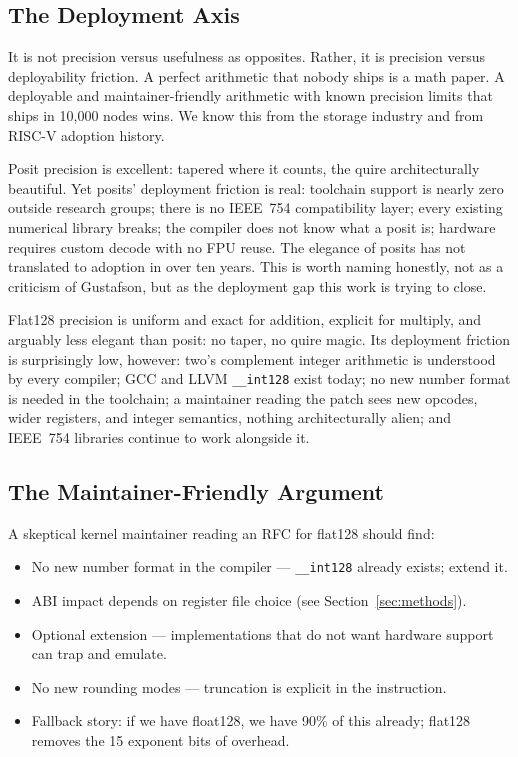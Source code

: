 \documentclass[runningheads]{llncs}
\begin{document}
\subsection{The Deployment Axis}

It is not precision versus usefulness as opposites. Rather, it is
precision versus deployability friction. A perfect arithmetic that nobody
ships is a math paper. A deployable and maintainer-friendly arithmetic
with known precision limits that ships in 10,000 nodes wins. We know
this from the storage industry and from RISC-V adoption history.

Posit precision is excellent: tapered where it counts, the quire architecturally beautiful. Yet posits' deployment friction is real: toolchain support is nearly zero outside research groups; there is no IEEE~754 compatibility layer; every existing numerical library breaks; the compiler does not know what a posit is; hardware requires custom decode with no FPU reuse. The elegance of posits has not translated to adoption in over ten years. This is worth naming honestly, not as a criticism of Gustafson, but as the deployment gap this work is trying to close.

Flat128 precision is uniform and exact for addition, explicit for multiply, and arguably less elegant than posit: no taper, no quire magic. Its deployment friction is surprisingly low, however: two's complement integer arithmetic is understood by every compiler; GCC and LLVM \texttt{\_\_int128} exist today; no new number format is needed in the toolchain; a maintainer reading the patch sees new opcodes, wider registers, and integer semantics, nothing architecturally alien; and IEEE~754 libraries continue to work alongside it.

\subsection{The Maintainer-Friendly Argument}

A skeptical kernel maintainer reading an RFC for flat128 should find:
\begin{itemize}
  \setlength{\itemsep}{4pt}
  \item No new number format in the compiler --- \texttt{\_\_int128}
  already exists; extend it.
  \item ABI impact depends on register file choice (see
  Section~\ref{sec:methods}).
  \item Optional extension --- implementations that do not want hardware
  support can trap and emulate.
  \item No new rounding modes --- truncation is explicit in the
  instruction.
  \item Fallback story: if we have float128, we have 90\% of this already;
  flat128 removes the 15 exponent bits of overhead.
\end{itemize}
\end{document}
